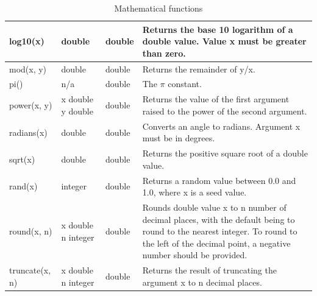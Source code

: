 \documentclass[11pt,a4paper]{ivoa}
\begin{document}
\begin{table}[thm]
\begin{tabular}{|p{}|p{}|p{}|p{}|}
        \hline
        log10(x) &
        double &
        double &
        Returns the base 10 logarithm of a double value. Value x must be greater than zero.
        \tabularnewline

        \hline
        mod(x, y) &
        double &
        double &
        Returns the remainder of y/x.
        \tabularnewline
        
        \hline
        pi() &
        n/a &
        double &
        The \(\pi\) constant.
        \tabularnewline
        
        \hline
        power(x, y) &
        x double \newline y double &
        double &
        Returns the value of the first argument raised to the power of the second argument.
        \tabularnewline

        \hline
        radians(x) &
        double &
        double &
        Converts an angle to radians. Argument x must be in degrees.
        \tabularnewline

        \hline
        sqrt(x) &
        double &
        double &
        Returns the positive square root of a double value.
        \tabularnewline

        \hline
        rand(x) &
        integer &
        double &
        Returns a random value between 0.0 and 1.0, where x is a seed  value.
        \tabularnewline

        \hline
        round(x, n) &
        x double \newline n integer &
        double &
        Rounds double value x to n number of decimal places, with the default being to round to the nearest integer.
        To round to the left of the decimal point, a negative number should be provided.
        \tabularnewline

        \hline
        truncate(x, n) &
        x double \newline n integer &
        double &
        Returns the result of truncating the argument x to n decimal places.
        \tabularnewline

        \hline
    \end{tabular}
    \caption{Mathematical functions}
    \label{table:math.functions.table}
\end{table}
\end{document}
